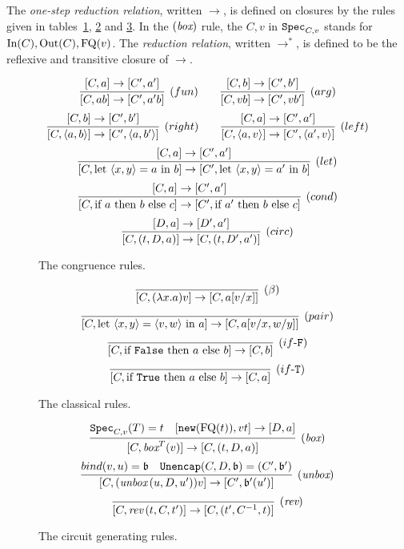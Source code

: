 \documentclass[twoside]{article}
\begin{document}

\begin{definition}
The \emph{one-step reduction relation}, written $\to$, is defined 
on closures by the rules given in tables~\hyperref[cong_rules]{\ref*{cong_rules}}, 
\hyperref[classical_rules]{\ref*{classical_rules}} 
and \hyperref[circ_gen_rules]{\ref*{circ_gen_rules}}. 
In the $(\mathop{\textit{box}}\nolimits)$ rule, the $C,v$ in $\texttt{Spec}_{C,v}$ stands for $\mathop{\textrm{In}}\nolimits(C),\mathop{\textrm{Out}}\nolimits(C),\mathop{\textrm{FQ}}\nolimits(v)$.
The \emph{reduction relation}, 
written $\to^*$, is defined to be the reflexive and transitive closure of $\to$.
\end{definition}

\begin{figure}[!ht]
\begin{mdframed}
\[
  \infer[(fun)]{[C,ab]\to[C',a'b]}{
    [C,a]\to[C',a']
  }
~~~~~~
  \infer[(arg)]{[C,vb]\to [C',vb']}{
    [C,b]\to [C',b']
  }
\]
\[
  \infer[(right)]{[C,\langle a,b\rangle]\to [C',\langle a,b'\rangle]}{
    [C,b]\to [C',b']
  }
~~~~~~
  \infer[(left)]{[C,\langle a,v\rangle]\to [C',\langle a',v\rangle]}{
    [C,a]\to [C',a']
  }
\]
\[
  \infer[(let)]{[C,\letin{\p{x,y}}{a}{b}]\to 
                [C', \letin{\p{x,y}}{a'}{b}]}{
    [C,a]\to [C',a']
  }
\]
\[
  \infer[(cond)]{[C, \ifthenelse{a}{b}{c}]\to [C', \ifthenelse{a'}{b}{c}]}{
    [C,a]\to [C',a']
  }
\]
\[
  \infer[(circ)]{[C, (t,D,a)]\to [C, (t,D',a')]}{
    [D,a]\to [D',a']
  }
\]
\end{mdframed}
\caption{The congruence rules.}
\label{cong_rules}
\end{figure}

\begin{figure}[!ht]
\begin{mdframed}
\[
  \infer[(\beta)]{[C,(\lambda x.a)v]\to [C, a[v/x]]}{}
\]
\[
  \infer[(pair)]{[C,\letin{\p{x,y}}{\p{v,w}}{a}]\to[C,a[v/x,w/y]]}{}
\]
\[
  \infer[(if\mbox{-}\mathtt{F})]{[C,\ifthenelse{\mathtt{False}}{a}{b}] \to [C, b]}{}
\]
\[
  \infer[(if\mbox{-}\mathtt{T})]{[C,\ifthenelse{\mathtt{True}}{a}{b}] \to [C, a]}{}
\]
\end{mdframed}
\caption{The classical rules.}
\label{classical_rules}
\end{figure}

\begin{figure}[!ht]
\begin{mdframed}
\[
  \infer[(\boxx)]{[C,\boxx^T(v)]\to [C,(t,D,a)]}{
    \spec_{C,v}(T)=t
    &
    [\mathtt{new}(\FQ(t)), vt] \to [D,a]
  }
\]
\[
  \infer[(\unbox)]{[C,(\unbox\,(u,D,u'))v]\to [C',\binding'(u')]}{
    bind(v,u)=\binding 
    &
    \mathtt{Unencap}(C,D,\binding) = (C',\binding') 
  }
\]
\[
  \infer[(\rev)]{[C,\rev\,(t,C,t')]\to [C,(t',C^{-1},t)]}{}
\]
\end{mdframed}
\caption{The circuit generating rules.}
\label{circ_gen_rules}
\end{figure}
\end{document}

